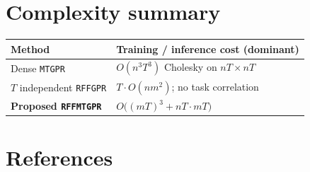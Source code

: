 \documentclass[11pt]{article}
\theoremstyle{plain}
\begin{document}
\section{Complexity summary}

\begin{center}
\renewcommand{\arraystretch}{1.3}
\begin{tabular}{@{}ll@{}}
\toprule
\textbf{Method} & \textbf{Training / inference cost (dominant)} \\
\midrule
Dense \texttt{MTGPR} & $O(n^3 T^3)$ Cholesky on $nT \times nT$ \\
$T$ independent \texttt{RFFGPR} & $T \cdot O(n m^2)$; no task correlation \\
\textbf{Proposed \texttt{RFFMTGPR}} & $O\bigl((mT)^3 + nT \cdot mT\bigr)$ \\
\bottomrule
\end{tabular}
\end{center}

\section{References}
\end{document}

